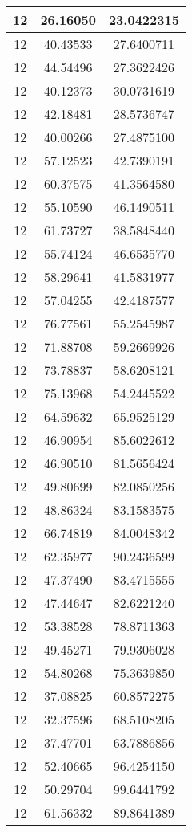 \documentclass[
]{book}
\begin{document}
\begin{tabular}{c|c|c}
\hline
12 & 26.16050 & 23.0422315\\
\hline
12 & 40.43533 & 27.6400711\\
\hline
12 & 44.54496 & 27.3622426\\
\hline
12 & 40.12373 & 30.0731619\\
\hline
12 & 42.18481 & 28.5736747\\
\hline
12 & 40.00266 & 27.4875100\\
\hline
12 & 57.12523 & 42.7390191\\
\hline
12 & 60.37575 & 41.3564580\\
\hline
12 & 55.10590 & 46.1490511\\
\hline
12 & 61.73727 & 38.5848440\\
\hline
12 & 55.74124 & 46.6535770\\
\hline
12 & 58.29641 & 41.5831977\\
\hline
12 & 57.04255 & 42.4187577\\
\hline
12 & 76.77561 & 55.2545987\\
\hline
12 & 71.88708 & 59.2669926\\
\hline
12 & 73.78837 & 58.6208121\\
\hline
12 & 75.13968 & 54.2445522\\
\hline
12 & 64.59632 & 65.9525129\\
\hline
12 & 46.90954 & 85.6022612\\
\hline
12 & 46.90510 & 81.5656424\\
\hline
12 & 49.80699 & 82.0850256\\
\hline
12 & 48.86324 & 83.1583575\\
\hline
12 & 66.74819 & 84.0048342\\
\hline
12 & 62.35977 & 90.2436599\\
\hline
12 & 47.37490 & 83.4715555\\
\hline
12 & 47.44647 & 82.6221240\\
\hline
12 & 53.38528 & 78.8711363\\
\hline
12 & 49.45271 & 79.9306028\\
\hline
12 & 54.80268 & 75.3639850\\
\hline
12 & 37.08825 & 60.8572275\\
\hline
12 & 32.37596 & 68.5108205\\
\hline
12 & 37.47701 & 63.7886856\\
\hline
12 & 52.40665 & 96.4254150\\
\hline
12 & 50.29704 & 99.6441792\\
\hline
12 & 61.56332 & 89.8641389\\

\end{tabular}
\end{document}
